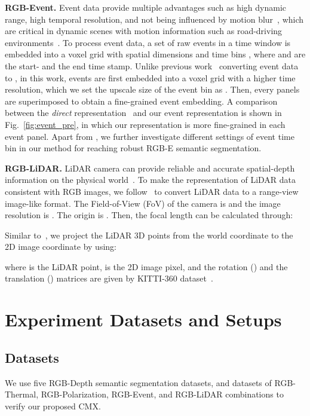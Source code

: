 \documentclass[journal]{IEEEtran}
\begin{document}
\noindent\textbf{RGB-Event.}
Event data provide multiple advantages such as high dynamic range, high temporal resolution, and not being influenced by motion blur~\cite{alonso2019ev_segnet}, which are critical in dynamic scenes with motion information such as road-driving environments~\cite{zhang2021issafe,zhang2021edcnet}. 
To process event data, a set of raw events in a time window  is embedded into a voxel grid with spatial dimensions  and time bins , where  and  are the start- and the end time stamp. Unlike previous work~\cite{gehrig2021eventscape_dataset} converting event data to , in this work, events are first embedded into a voxel grid with a higher time resolution, which we set the upscale size of the event bin as . Then, every  panels are superimposed to obtain a fine-grained event embedding.
A comparison between the \textit{direct} representation~\cite{gehrig2021eventscape_dataset} and our event representation is shown in Fig.~\ref{fig:event_pre}, in which our representation is more fine-grained in each event panel.
Apart from , we further investigate different settings of event time bin  in our method for reaching robust RGB-E semantic segmentation.

\noindent\textbf{RGB-LiDAR.}
LiDAR camera can provide reliable and accurate {spatial-depth} information on the physical world~\cite{zhuang2021pmf}. To make the representation of LiDAR data consistent with RGB images, we follow~\cite{zhuang2021pmf} to convert LiDAR data to a range-view image-like format. The Field-of-View (FoV) of the camera is  and the image resolution is . The origin is . Then, the focal length  can be calculated through:

{Similar to~\cite{mohammadbagher2020real}, we project the LiDAR 3D points from the world coordinate to the 2D image coordinate by using:

where  is the LiDAR point,  is the 2D image pixel, and the rotation () and the translation () matrices are given by KITTI-360 dataset~\cite{liao2021kitti360}.}

\section{Experiment Datasets and Setups}
\subsection{Datasets}
We use five RGB-Depth semantic segmentation datasets, and datasets of RGB-Thermal, RGB-Polarization, RGB-Event, and RGB-LiDAR combinations to verify our proposed CMX.
\end{document}
